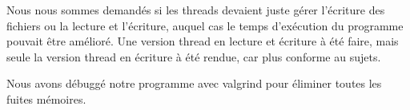 \documentclass[a4paper,11pt, oneside]{book}
\begin{document}
\par{Nous nous sommes demandés si les threads devaient juste gérer l’écriture des fichiers ou la lecture et l'écriture, auquel cas le temps d'exécution du programme pouvait être amélioré. Une version thread en lecture et écriture à été faire, mais seule la version thread en écriture à été rendue, car plus conforme au sujets. }

\par{Nous avons débuggé notre programme avec valgrind pour éliminer toutes les fuites mémoires.}


	

	\newpage
	

	

	\clearpage
\end{document}
